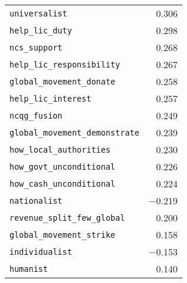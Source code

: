 \begin{tabular}[h]{lr}
\verb|universalist| & 0.306\\
\verb|help_lic_duty| & 0.298\\
\verb|ncs_support| & 0.268\\
\verb|help_lic_responsibility| & 0.267\\
\verb|global_movement_donate| & 0.258\\
\verb|help_lic_interest| & 0.257\\
\verb|ncqg_fusion| & 0.249\\
\verb|global_movement_demonstrate| & 0.239\\
\verb|how_local_authorities| & 0.230\\
\verb|how_govt_unconditional| & 0.226\\
\verb|how_cash_unconditional| & 0.224\\
\verb|nationalist| & $-$0.219\\
\verb|revenue_split_few_global| & 0.200\\
\verb|global_movement_strike| & 0.158\\
\verb|individualist| & $-$0.153\\
\verb|humanist| & 0.140\\
\bottomrule
\end{tabular}
